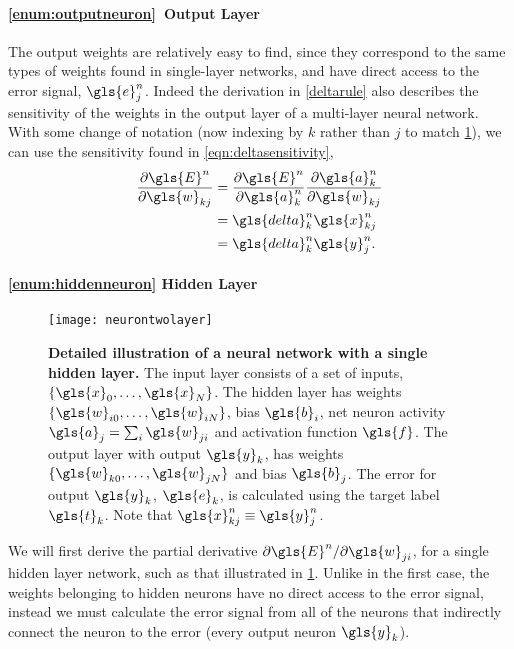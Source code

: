 \documentclass[thesis]{subfiles}
\begin{document}
\paragraph{\ref{enum:outputneuron}~Output Layer}
The output weights are relatively easy to find, since they correspond to the same types of weights found in single-layer networks, and have direct access to the error signal, \ie$\gls{e}^n_j$. Indeed the derivation in \cref{deltarule} also describes the sensitivity of the weights in the output layer of a multi-layer neural network. With some change of notation (now indexing by $k$ rather than $j$ to match \cref{fig:neurontwolayer}), we can use the sensitivity found in \cref{eqn:deltasensitivity},
%
\begin{equation}
\begin{aligned}
    \frac{\partial \gls{E}^n}{\partial \gls{w}_{kj}} &= \frac{\partial \gls{E}^n}{\partial \gls{a}^n_k} \frac{\partial \gls{a}^n_k}{\partial \gls{w}_{kj}}\\
    &= \gls{delta}^n_k \gls{x}^n_{kj}\\
    &= \gls{delta}^n_k \gls{y}^n_j.
\end{aligned}
\label{eqn:outputlayer}
\end{equation}
%
\paragraph{\ref{enum:hiddenneuron} Hidden Layer}
\begin{figure}[tbp]
\centering
\texttt{[image: neurontwolayer]}
\caption[Detailed illustration of a neural network with a single hidden layer]{\textbf{Detailed illustration of a neural network with a single hidden layer.} The input layer consists of a set of inputs, $\{\gls{x}_{0}, \ldots, \gls{x}_{N}\}$. The hidden layer has weights $\{\gls{w}_{i0}, \ldots, \gls{w}_{iN}\}$, bias $\gls{b}_i$, net neuron activity $\gls{a}_j = \sum_i \gls{w}_{ji}$ and activation function $\gls{f}$. The output layer with output $\gls{y}_k$, has weights $\{\gls{w}_{k0}, \ldots, \gls{w}_{jN}\}$ and bias $\gls{b}_j$. The error for output $\gls{y}_k$, $\gls{e}_k$, is calculated using the target label $\gls{t}_k$. Note that $\gls{x}^n_{kj} \equiv \gls{y}^n_j$.}
\label{fig:neurontwolayer}
\end{figure}
We will first derive the partial derivative ${\partial \gls{E}^n}/{\partial \gls{w}_{ji}}$, for a single hidden layer network, such as that illustrated in \cref{fig:neurontwolayer}. Unlike in the first case, the weights belonging to hidden neurons have no direct access to the error signal, instead we must calculate the error signal from all of the neurons that indirectly connect the neuron to the error (\ie every output neuron $\gls{y}_k$).
\end{document}

